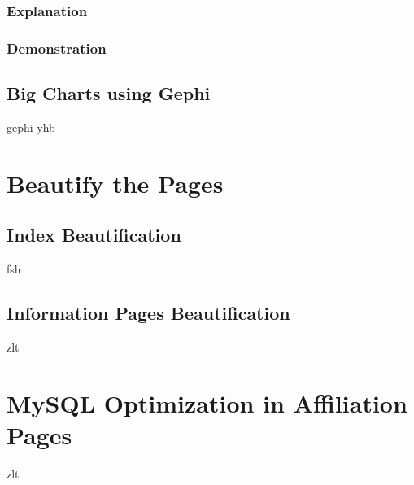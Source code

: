\documentclass{book}
\begin{document}
\subsection{Explanation}

\subsection{Demonstration}


\section{Big Charts using Gephi}

gephi yhb



\chapter {Beautify the Pages}

\section {Index Beautification}

fsh

\section {Information Pages Beautification}

zlt


\chapter {MySQL Optimization in Affiliation Pages}

zlt
\end{document}
